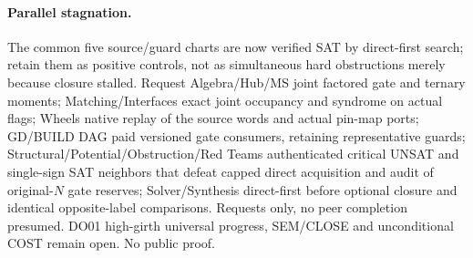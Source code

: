 \documentclass[11pt]{article}
\begin{document}
\paragraph{Parallel stagnation.}
The common five source/guard charts are now verified SAT by direct-first search; retain them as positive controls, not as simultaneous hard obstructions merely because closure stalled. Request Algebra/Hub/MS joint factored gate and ternary moments; Matching/Interfaces exact joint occupancy and syndrome on actual flags; Wheels native replay of the source words and actual pin-map ports; GD/BUILD DAG paid versioned gate consumers, retaining representative guards; Structural/Potential/Obstruction/Red Teams authenticated critical UNSAT and single-sign SAT neighbors that defeat capped direct acquisition and audit of original-$N$ gate reserves; Solver/Synthesis direct-first before optional closure and identical opposite-label comparisons. Requests only, no peer completion presumed. DO01 high-girth universal progress, SEM/CLOSE and unconditional COST remain open. No public proof.
\end{document}
